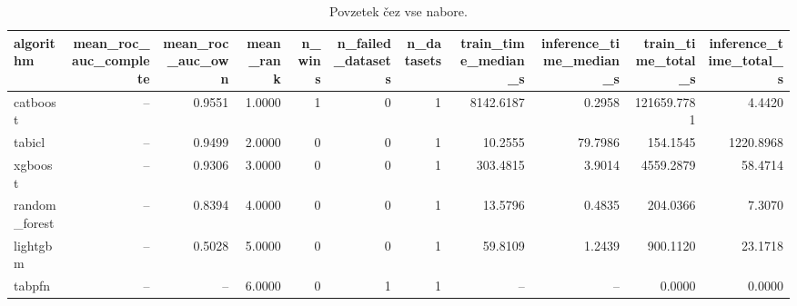 \begin{table}[htbp]
\centering
\caption{Povzetek čez vse nabore.}
\label{tab:overall}
\begin{tabular}{lrrrrrrrrrr}
\hline
algorithm & mean\_roc\_auc\_complete & mean\_roc\_auc\_own & mean\_rank & n\_wins & n\_failed\_datasets & n\_datasets & train\_time\_median\_s & inference\_time\_median\_s & train\_time\_total\_s & inference\_time\_total\_s \\
\hline
catboost & -- & 0.9551 & 1.0000 & 1 & 0 & 1 & 8142.6187 & 0.2958 & 121659.7781 & 4.4420 \\
tabicl & -- & 0.9499 & 2.0000 & 0 & 0 & 1 & 10.2555 & 79.7986 & 154.1545 & 1220.8968 \\
xgboost & -- & 0.9306 & 3.0000 & 0 & 0 & 1 & 303.4815 & 3.9014 & 4559.2879 & 58.4714 \\
random\_forest & -- & 0.8394 & 4.0000 & 0 & 0 & 1 & 13.5796 & 0.4835 & 204.0366 & 7.3070 \\
lightgbm & -- & 0.5028 & 5.0000 & 0 & 0 & 1 & 59.8109 & 1.2439 & 900.1120 & 23.1718 \\
tabpfn & -- & -- & 6.0000 & 0 & 1 & 1 & -- & -- & 0.0000 & 0.0000 \\
\hline
\end{tabular}
\end{table}
